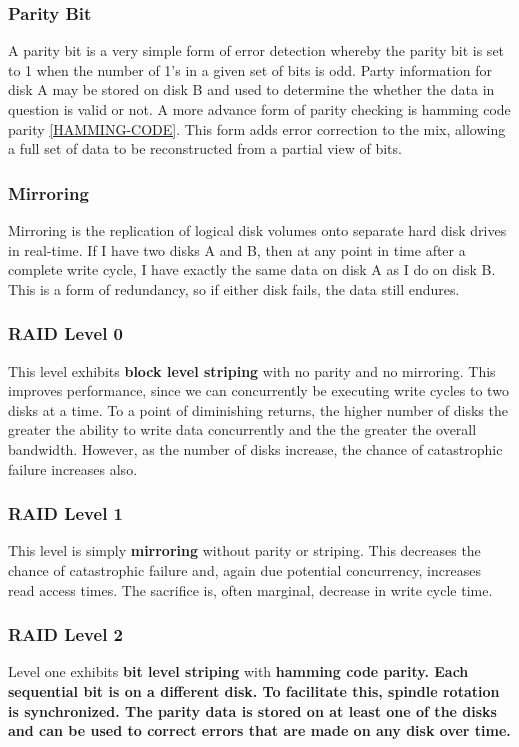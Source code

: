 \documentclass[10pt,a4paper]{article}
\begin{document}
\subsubsection{Parity Bit}
A parity bit is a very simple form of error detection whereby the parity bit is set to 1 when the number of 1's in a given set of bits is odd. Party information for disk A may be stored on disk B and used to determine the whether the data in question is valid or not. A more advance form of parity checking is hamming code parity \ref{HAMMING-CODE}. This form adds error correction to the mix, allowing a full set of data to be reconstructed from a partial view of bits. 
\subsubsection{Mirroring}
Mirroring is the replication of logical disk volumes onto separate hard disk drives in real-time. If I have two disks A and B, then at any point in time after a complete write cycle, I have exactly the same data on disk A as I do on disk B. This is a form of redundancy, so if either disk fails, the data still endures. 
\subsubsection{RAID Level 0}
This level exhibits {\bf block level striping} with no parity and no mirroring. This improves performance, since we can concurrently be executing write cycles to two disks at a time. To a point of diminishing returns, the higher number of disks the greater the ability to write data concurrently and the the greater the overall bandwidth. However, as the number of disks increase, the chance of catastrophic failure increases also. 
\subsubsection{RAID Level 1}
This level is simply {\bf mirroring} without parity or striping. This decreases the chance of catastrophic failure and, again due potential concurrency, increases read access times. The sacrifice is, often marginal, decrease in write cycle time. 
\subsubsection{RAID Level 2}
Level one exhibits {\bf bit level striping} with \bf{hamming code parity}. Each sequential bit is on a different disk. To facilitate this, spindle rotation is synchronized. The parity data is stored on at least one of the disks and can be used to correct errors that are made on any disk over time. 
\end{document}
